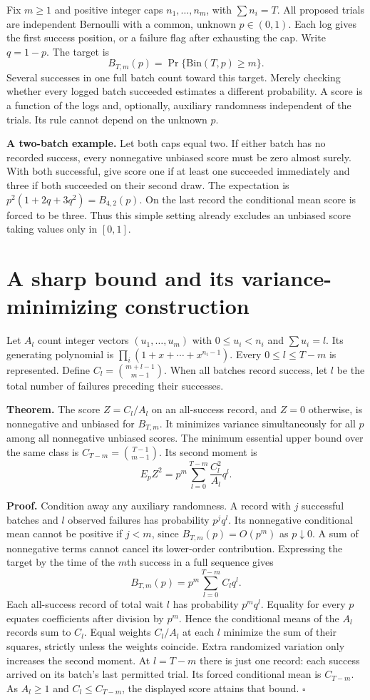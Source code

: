 \documentclass[11pt]{article}
\begin{document}
Fix $m\ge1$ and positive integer caps $n_1,\ldots,n_m$, with $\sum n_i=T$. All proposed trials are independent Bernoulli with a common, unknown $p\in(0,1)$. Each log gives the first success position, or a failure flag after exhausting the cap. Write $q=1-p$. The target is
\[
 B_{T,m}(p)=\Pr\{\mathrm{Bin}(T,p)\ge m\}.
\]
Several successes in one full batch count toward this target. Merely checking whether every logged batch succeeded estimates a different probability. A score is a function of the logs and, optionally, auxiliary randomness independent of the trials. Its rule cannot depend on the unknown $p$.

\textbf{A two-batch example.} Let both caps equal two. If either batch has no recorded success, every nonnegative unbiased score must be zero almost surely. With both successful, give score one if at least one succeeded immediately and three if both succeeded on their second draw. The expectation is $p^2(1+2q+3q^2)=B_{4,2}(p)$. On the last record the conditional mean score is forced to be three. Thus this simple setting already excludes an unbiased score taking values only in $[0,1]$.

\newpage
\section*{A sharp bound and its variance-minimizing construction}
Let $A_l$ count integer vectors $(u_1,\ldots,u_m)$ with $0\le u_i<n_i$ and $\sum u_i=l$. Its generating polynomial is $\prod_i(1+x+\cdots+x^{n_i-1})$. Every $0\le l\le T-m$ is represented. Define $C_l=\binom{m+l-1}{m-1}$. When all batches record success, let $l$ be the total number of failures preceding their successes.

\textbf{Theorem.} The score $Z=C_l/A_l$ on an all-success record, and $Z=0$ otherwise, is nonnegative and unbiased for $B_{T,m}$. It minimizes variance simultaneously for all $p$ among all nonnegative unbiased scores. The minimum essential upper bound over the same class is $C_{T-m}=\binom{T-1}{m-1}$. Its second moment is
\[
 E_p Z^2=p^m\sum_{l=0}^{T-m}\frac{C_l^2}{A_l}q^l .
\]

\textbf{Proof.} Condition away any auxiliary randomness. A record with $j$ successful batches and $l$ observed failures has probability $p^j q^l$. Its nonnegative conditional mean cannot be positive if $j<m$, since $B_{T,m}(p)=O(p^m)$ as $p\downarrow0$. A sum of nonnegative terms cannot cancel its lower-order contribution. Expressing the target by the time of the $m$th success in a full sequence gives
\[
 B_{T,m}(p)=p^m\sum_{l=0}^{T-m} C_l q^l.
\]
Each all-success record of total wait $l$ has probability $p^m q^l$. Equality for every $p$ equates coefficients after division by $p^m$. Hence the conditional means of the $A_l$ records sum to $C_l$. Equal weights $C_l/A_l$ at each $l$ minimize the sum of their squares, strictly unless the weights coincide. Extra randomized variation only increases the second moment. At $l=T-m$ there is just one record: each success arrived on its batch's last permitted trial. Its forced conditional mean is $C_{T-m}$. As $A_l\ge1$ and $C_l\le C_{T-m}$, the displayed score attains that bound. \hfill$\square$
\end{document}
